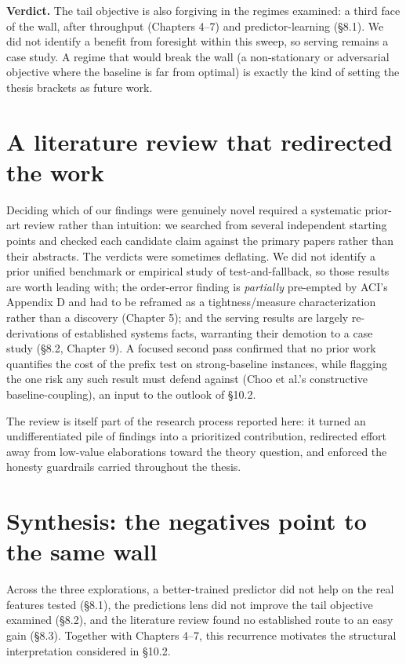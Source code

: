 \textbf{Verdict.} The tail objective is also forgiving in the regimes
examined: a third face of the wall, after throughput (Chapters 4--7) and
predictor-learning (§8.1). We did not identify a benefit from foresight
within this sweep, so serving remains a case study. A regime that would
break the wall (a non-stationary or adversarial objective where the
baseline is far from optimal) is exactly the kind of setting the thesis
brackets as future work.

\section{A literature review that redirected the
work}

Deciding which of our findings were genuinely novel required a
systematic prior-art review rather than intuition: we searched from
several independent starting points and checked each candidate claim
against the primary papers rather than their abstracts. The verdicts
were sometimes deflating. We did not identify a prior unified benchmark
or empirical study of test-and-fallback, so those results are worth
leading with; the order-error finding is \emph{partially} pre-empted by
ACI's Appendix D and had to be reframed as a tightness/measure
characterization rather than a discovery (Chapter 5); and the serving
results are largely re-derivations of established systems facts,
warranting their demotion to a case study (§8.2, Chapter 9). A focused
second pass confirmed that no prior work quantifies the cost of the
prefix test on strong-baseline instances, while flagging the one risk
any such result must defend against (Choo et al.'s constructive
baseline-coupling), an input to the outlook of §10.2.

The review is itself part of the research process reported here: it
turned an undifferentiated pile of findings into a prioritized
contribution, redirected effort away from low-value elaborations toward
the theory question, and enforced the honesty guardrails carried
throughout the thesis.

\section{Synthesis: the negatives point to the same
wall}

Across the three explorations, a better-trained predictor did not help
on the real features tested (§8.1), the predictions lens did not improve
the tail objective examined (§8.2), and the literature review found no
established route to an easy gain (§8.3). Together with Chapters 4--7,
this recurrence motivates the structural interpretation considered in
§10.2.
